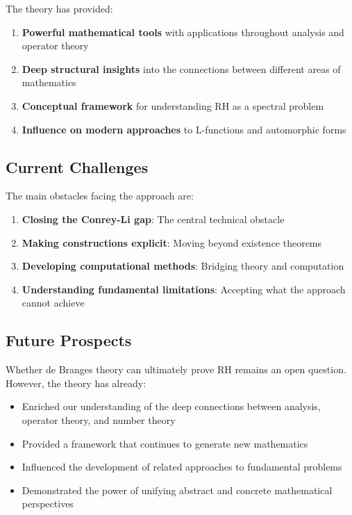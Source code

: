 The theory has provided:

\begin{enumerate}
\item \textbf{Powerful mathematical tools} with applications throughout analysis and operator theory
\item \textbf{Deep structural insights} into the connections between different areas of mathematics  
\item \textbf{Conceptual framework} for understanding RH as a spectral problem
\item \textbf{Influence on modern approaches} to L-functions and automorphic forms
\end{enumerate}

\subsection{Current Challenges}

The main obstacles facing the approach are:

\begin{enumerate}
\item \textbf{Closing the Conrey-Li gap}: The central technical obstacle
\item \textbf{Making constructions explicit}: Moving beyond existence theorems
\item \textbf{Developing computational methods}: Bridging theory and computation  
\item \textbf{Understanding fundamental limitations}: Accepting what the approach cannot achieve
\end{enumerate}

\subsection{Future Prospects}

Whether de Branges theory can ultimately prove RH remains an open question. However, the theory has already:

\begin{itemize}
\item Enriched our understanding of the deep connections between analysis, operator theory, and number theory
\item Provided a framework that continues to generate new mathematics
\item Influenced the development of related approaches to fundamental problems
\item Demonstrated the power of unifying abstract and concrete mathematical perspectives
\end{itemize}

